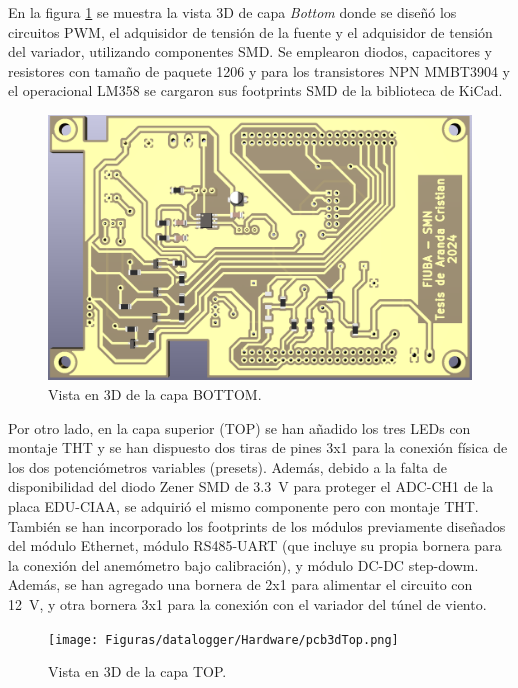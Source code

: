 En la figura \ref{fig:pcb3dBottom} se muestra la vista 3D de capa \textit{Bottom} donde se diseñó los circuitos PWM, el adquisidor de tensión de la fuente y el adquisidor de tensión del variador, utilizando componentes SMD. Se emplearon diodos, capacitores y resistores con tamaño de paquete 1206 y para los transistores NPN MMBT3904 y el operacional LM358 se cargaron sus footprints SMD de la biblioteca de KiCad.


\begin{figure}[H]
    \centering
    \includegraphics[width=0.95\linewidth]{Figuras/datalogger/Hardware/pcb3dBottom.png}
    \caption{Vista en 3D de la capa BOTTOM.}
    \label{fig:pcb3dBottom}
\end{figure}

Por otro lado, en la capa superior (TOP) se han añadido los tres LEDs con montaje THT y se han dispuesto dos tiras de pines 3x1 para la conexión física de los dos potenciómetros variables (presets). Además, debido a la falta de disponibilidad del diodo Zener SMD de \SI{3.3}{\volt} para proteger el ADC-CH1 de la placa EDU-CIAA, se adquirió el mismo componente pero con montaje THT. También se han incorporado los footprints de los módulos previamente diseñados del módulo Ethernet, módulo RS485-UART (que incluye su propia bornera para la conexión del anemómetro bajo calibración), y módulo DC-DC step-dowm. Además, se han agregado una bornera de 2x1 para alimentar el circuito con \SI{12}{\volt}, y otra bornera 3x1 para la conexión con el variador del túnel de viento.


\begin{figure}[H]
    \centering
    \texttt{[image: Figuras/datalogger/Hardware/pcb3dTop.png]}
    \caption{Vista en 3D de la capa TOP.}
    \label{fig:pcb3dTop}
\end{figure}

